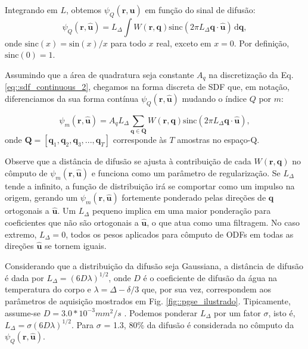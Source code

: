 \documentclass[
    12pt,                %
    oneside,            %
    a4paper,            %
    english,            %
    french,                %
    spanish,            %
    brazil                %
    ]{abntex2}
\begin{document}
Integrando em $L$, obtemos $\psi_Q(\mathbf{r}, \mathbf{\hat{u}})$ em função do sinal de difusão: 
\begin{equation}
\label{eq::sdf_continuous_2}
    \psi_Q(\mathbf{r}, \mathbf{\hat{u}}) =
    L_{\Delta} \int \! W(\mathbf{r}, \mathbf{q}) \text{sinc}(2\pi L_{\Delta} \mathbf{q} \cdot \mathbf{\hat{u}}) \,\mathrm{d}\mathbf{q} ,
\end{equation}
onde $\text{sinc}(x) = \text{sin}(x)/x$ para todo $x$ real, exceto em $x=0$. Por definição, $\text{sinc}(0) = 1$.

Assumindo que a área de quadratura seja constante $A_q$ na discretização da Eq. \ref{eq::sdf_continuous_2}, chegamos na forma discreta de SDF que, em notação, diferenciamos da sua forma contínua $\psi_Q(\mathbf{r}, \mathbf{\hat{u}})$ mudando o índice $Q$ por $m$:


\begin{equation}
\label{eq::sdf_discrete_1}
    \psi_m(\mathbf{r}, \mathbf{\hat{u}}) =
     A_qL_{\Delta}\sum_{\mathbf{q} \in \mathbf{Q}} W(\mathbf{r}, \mathbf{q})\text{sinc}(2\pi L_{\Delta} \mathbf{q}\cdot\mathbf{\hat{u}}),
\end{equation}
onde $\mathbf{Q}= [
\mathbf{q}_1,
\mathbf{q}_2,
\mathbf{q}_3, ...,
\mathbf{q}_T
]$ corresponde às $T$ amostras no espaço-Q.

Observe que a distância de difusão se ajusta à contribuição de cada $W(\mathbf{r}, \mathbf{q})$ no cômputo de $\psi_m(\mathbf{r}, \mathbf{\hat{u}})$ e funciona como um parâmetro de regularização. Se $L_{\Delta}$ tende a infinito, a função de distribuição irá se comportar como um impulso na origem, gerando um $\psi_m(\mathbf{r}, \mathbf{\hat{u}})$ fortemente ponderado pelas direções de $\mathbf{q}$ ortogonais a $\mathbf{\hat{u}}$. Um $L_{\Delta}$ pequeno implica em uma maior ponderação para coeficientes que não são ortogonais a $\mathbf{\hat{u}}$, o que atua como uma filtragem. No caso extremo, $L_{\Delta} = 0$, todos os pesos aplicados para cômputo de ODFs em todas as direções $\mathbf{\hat{u}}$ se tornem iguais.

Considerando que a distribuição da difusão seja Gaussiana, a distância de difusão é dada por $L_{\Delta}=(6D\lambda)^{1/2}$, onde $D$ é o coeficiente de difusão da água na temperatura do corpo e $\lambda = \Delta - \delta/3$ que, por sua vez, correspondem aos parâmetros de aquisição mostrados em Fig. \ref{fig::pgse_ilustrado}. 
Tipicamente, assume-se $D = 3.0*10^{-3} mm^2/s$ \cite{yeh2019_DSI}. Podemos ponderar $L_{\Delta}$ por um fator $\sigma$, isto é, $L_{\Delta} = \sigma(6D\lambda)^{1/2}$. Para $\sigma$ = 1.3, $80\%$ da difusão é considerada no cômputo da $\psi_Q(\mathbf{r}, \mathbf{\hat{u}})$.
\end{document}
